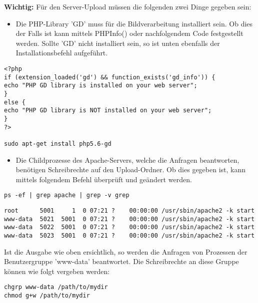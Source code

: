 

\textbf{Wichtig:} 
Für den Server-Upload müssen die folgenden zwei Dinge gegeben sein:
\begin{itemize}
	\item Die PHP-Library 'GD' muss für die Bildverarbeitung installiert sein. Ob dies der Falls ist kann mittels PHPInfo() oder nachfolgendem Code festgestellt werden. \cite{zoopable.com} Sollte 'GD' nicht installiert sein, so ist unten ebenfalls der Installationsbefehl aufgeführt. \cite{askubuntu.com_php_extension}
\end{itemize}
\begin{lstlisting}
<?php
if (extension_loaded('gd') && function_exists('gd_info')) {
echo "PHP GD library is installed on your web server";
}
else {
echo "PHP GD library is NOT installed on your web server";
}
?>

sudo apt-get install php5.6-gd
\end{lstlisting}

\begin{itemize}
	\item Die Childprozesse des Apache-Servers, welche die Anfragen beantworten, benötigen Schreibrechte auf den Upload-Ordner. Ob dies gegeben ist, kann mittels folgendem Befehl überprüft und geändert werden. \cite{askubuntu.com_permissions} 
\end{itemize}
\begin{lstlisting}
ps -ef | grep apache | grep -v grep
\end{lstlisting}

\begin{lstlisting}
root      5001     1  0 07:21 ?    00:00:00 /usr/sbin/apache2 -k start
www-data  5021  5001  0 07:21 ?    00:00:00 /usr/sbin/apache2 -k start
www-data  5022  5001  0 07:21 ?    00:00:00 /usr/sbin/apache2 -k start
www-data  5023  5001  0 07:21 ?    00:00:00 /usr/sbin/apache2 -k start
\end{lstlisting}

Ist die Ausgabe wie oben ersichtlich, so werden die Anfragen von Prozessen der Benutzergruppe 'www-data' beantwortet. Die Schreibrechte an diese Gruppe können wie folgt vergeben werden:
\begin{lstlisting}
chgrp www-data /path/to/mydir
chmod g+w /path/to/mydir
\end{lstlisting}
